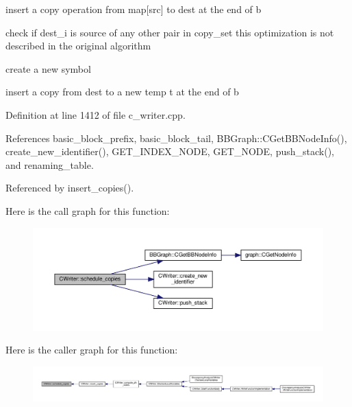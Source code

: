 insert a copy operation from map\mbox{[}src\mbox{]} to dest at the end of b

check if dest\+\_\+i is source of any other pair in copy\+\_\+set this optimization is not described in the original algorithm

create a new symbol

insert a copy from dest to a new temp t at the end of b 

Definition at line 1412 of file c\+\_\+writer.\+cpp.



References basic\+\_\+block\+\_\+prefix, basic\+\_\+block\+\_\+tail, B\+B\+Graph\+::\+C\+Get\+B\+B\+Node\+Info(), create\+\_\+new\+\_\+identifier(), G\+E\+T\+\_\+\+I\+N\+D\+E\+X\+\_\+\+N\+O\+DE, G\+E\+T\+\_\+\+N\+O\+DE, push\+\_\+stack(), and renaming\+\_\+table.



Referenced by insert\+\_\+copies().

Here is the call graph for this function\+:
\nopagebreak
\begin{figure}[H]
\begin{center}
\leavevmode
\includegraphics[width=350pt]{d3/d59/classCWriter_acb226fc206697e5e5a8b5e85bbd1b689_cgraph}
\end{center}
\end{figure}
Here is the caller graph for this function\+:
\nopagebreak
\begin{figure}[H]
\begin{center}
\leavevmode
\includegraphics[width=350pt]{d3/d59/classCWriter_acb226fc206697e5e5a8b5e85bbd1b689_icgraph}
\end{center}
\end{figure}
\mbox{\label{classCWriter_a10dc0cac6629dd939842250345feb477}} 
